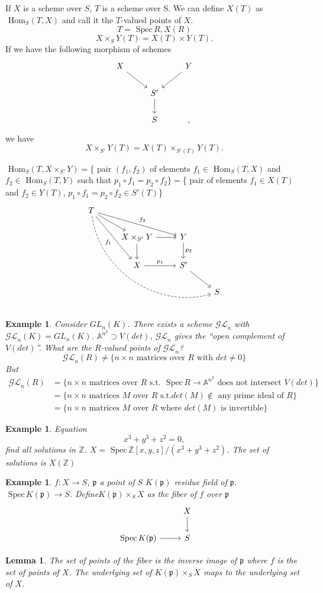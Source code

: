 \documentclass[11pt]{article}
\newtheorem{lemma}[thm]{Lemma}
\newtheorem{ex}[thm]{Example}
\renewcommand{\hom}{\text{ Hom}}
\newcommand{\spec}{\text{ Spec}\,}
\newcommand{\affn}{\mathbb A}
\newcommand{\intg}{\mathbb Z}
\newcommand{\scp}{{\mathfrak p}}
\newcommand{\lrta}{\longrightarrow}
\begin{document}
If $X$ is a scheme over $S$, $T$ is a scheme over S. We can define $X(T)$ as $\hom_S(T,X)$
and call it the $T$-valued points of $X$.
$$
T=\spec R, X(R)
$$
$$
X\times_S Y(T)=X(T)\times Y(T).
$$
If we have the following morphism of schemes
$$
\begin{tikzcd}
X \arrow[rd] &  & Y \arrow[ld] \\
 & S' \arrow[d] &  \\
 & S &, 
\end{tikzcd}
$$
 we have 
 $$
X\times_{S'} Y(T)=X(T)\times_{S'(T)} Y(T).
 $$

$\hom_S(T,X\times_{S'}Y)=$\{ pair $(f_1,f_2)$ of elements $f_1\in \hom_{S}(T,X)$ and $f_2\in \hom_S(T,Y)$  such that $p_1\circ f_1=p_2\circ f_2$\}$=$\{ pair of elements $f_1\in X(T)$ and $f_2\in Y(T)$, $p_1\circ f_1=p_2\circ f_2\in S'(T)$\}
$$
\begin{tikzcd}
T \arrow[rd] \arrow[rdd, "f_1"'] \arrow[rrd, "f_2"] \arrow[rrrddd, dashed, bend right=49] &  &  &  \\
 & X\times_{S'}Y \arrow[d] \arrow[r] & Y \arrow[d, "p_2"] &  \\
 & X \arrow[r, "p_1"] & S' \arrow[rd] &  \\
 &  &  & S
\end{tikzcd}
$$
\begin{ex}Consider
$GL_n(K)$. There exists a scheme $\mathcal{GL}_n$ with $\mathcal{GL}_n(K)=GL_n(K)$.
$\affn^{n^2}\supset V(det)$, $\mathcal{GL}_n$ gives the ``open complement of $V(det)$''. What are the $R$-valued points of $\mathcal{GL}_n$?
$$
\mathcal{GL}_n(R)\neq \{n\times n\text{ matrices over $R$ with } det \neq 0 \}
$$
But
$$
\begin{aligned}
\mathcal{GL}_n(R)&=\{n\times n\text{ matrices over $R$ s.t. }\spec R\lrta \affn^{n^2}\text{ does not intersect }V(det)\}\\
&=\{n\times n\text{ matrices $M$ over $R$ s.t.} det(M) \notin\text{ any prime ideal of }R \}\\
&=\{n\times n\text{ matrices $M$ over $R$ where } det(M)\text{ is invertible}\}
\end{aligned}
$$
\end{ex}

\begin{ex}
Equation
$$
x^3+y^3+z^2=0,
$$
find all solutions in $\intg$. 
$X=\spec \intg[x,y,z]/(x^3+y^3+z^2)$. The set of solutions is $X(\intg)$
\end{ex}

\begin{ex}
$f:X\lrta S$, $\scp$ a point of $S$
$K(\scp)$ residue field of $\scp$. $\spec K(\scp)\lrta S$. Define$K(\scp)\times_S X$ as the fiber of $f$ over $\scp$
$$
\begin{tikzcd}
 & X \arrow[d] \\
\spec K(\scp) \arrow[r] & S
\end{tikzcd}
$$
\end{ex}
\begin{lemma}
The set of points of the fiber is the inverse image of $\scp$ where $f$ is the set of points of $X$. The underlying set of $K(\scp)\times_SX$ maps to the underlying set of $X$.


\end{lemma}
\end{document}
